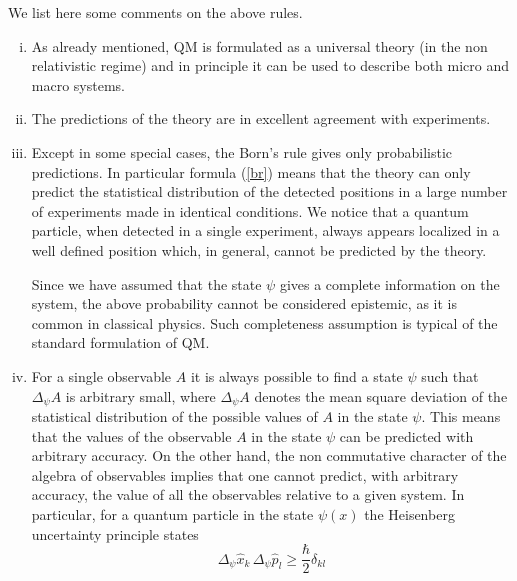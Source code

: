 \documentclass[12pt,reqno]{amsart}
\newcommand{\vs}{\medskip}
\newcommand{\f}{\frac}
\newcommand{\be}{\begin{equation}}
\newcommand{\ee}{\end{equation}}
\numberwithin{equation}{section}
\begin{document}
\vs


\noindent
We list here some comments on the above rules. 
\vs

\begin{enumerate}[(i)]

\item As already mentioned, QM is formulated as a universal theory (in the non relativistic regime) and in principle it can be used to describe both micro and macro systems.


\item  The predictions of the theory are in excellent agreement with experiments.


\item Except in some special cases, the Born's rule gives only probabilistic predictions. In particular formula (\ref{br}) means that the theory can only predict the statistical distribution of the detected positions in a large number of experiments made in identical conditions. We notice  that a quantum particle, when detected in a single experiment, always appears localized in a well defined position which, in general, cannot be predicted by the theory. 

Since we have assumed that the state $\psi$ gives a complete information on the system, the above probability cannot be considered epistemic, as it is common in classical physics.  Such  completeness assumption is typical of the standard formulation of QM.



\item  For a single observable $A$ it is always possible to find a state $\psi$ such that $\Delta_{\psi} A$ is arbitrary small, where $\Delta_{\psi} A$ denotes the mean square deviation of the statistical distribution of the possible values of $A$ in the state $\psi$. This means that the values of the observable $A$ in the state $\psi $ can be predicted with arbitrary accuracy.  On the other hand, the non commutative character of the algebra of observables implies that one cannot predict, with arbitrary accuracy, the value of all the observables relative to a given system. In particular, for a quantum particle in the state $\psi(x)$  the Heisenberg uncertainty principle states
\be\label{ind}
\Delta_{\psi} \hat{x}_k \, \Delta_{\psi} \hat{p}_l \geq \f{\hbar}{2} \delta_{kl}
\ee



\end{enumerate}
\end{document}
